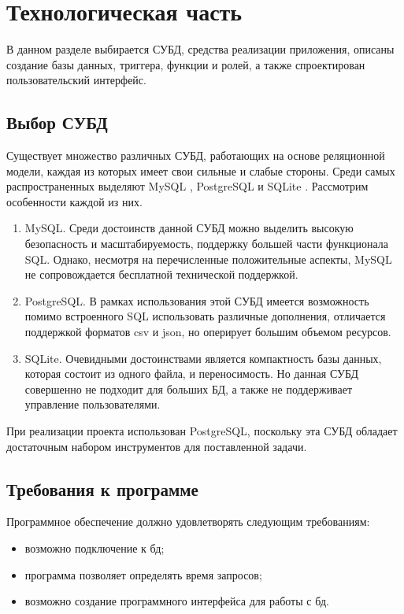 \section{Технологическая часть}

В данном разделе выбирается СУБД, средства реализации приложения,
описаны создание базы данных, триггера, функции и ролей,
а также спроектирован пользовательский интерфейс.

\subsection{Выбор СУБД}

Существует множество различных СУБД, работающих на основе реляционной модели,
каждая из которых имеет свои сильные и слабые стороны.
Среди самых распространенных \cite{most_popular} выделяют MySQL \cite{mysql},
PostgreSQL \cite{postgresql} и SQLite \cite{sqlite}.
Рассмотрим особенности каждой из них.

\begin{enumerate}
    \item MySQL. Среди достоинств данной СУБД можно выделить высокую
          безопасность и масштабируемость,
          поддержку большей части функционала SQL. Однако, несмотря на перечисленные
          положительные аспекты,
          MySQL не сопровождается бесплатной технической поддержкой.
    \item PostgreSQL. В рамках использования этой СУБД имеется возможность
          помимо встроенного SQL использовать различные дополнения,
          отличается поддержкой форматов csv и json, но оперирует большим объемом
          ресурсов.
    \item SQLite. Очевидными достоинствами является компактность базы
          данных, которая состоит из одного файла,
          и переносимость.
          Но данная СУБД совершенно не подходит для больших БД, а также не
          поддерживает управление пользователями.
\end{enumerate}

При реализации проекта использован PostgreSQL,
поскольку эта СУБД обладает достаточным набором инструментов для поставленной
задачи.
\subsection{Требования к программе}

Программное обеспечение должно удовлетворять следующим требованиям:
\begin{itemize}
	\item возможно подключение к бд;
	\item программа позволяет определять время запросов;
	\item возможно создание программного интерфейса для работы с бд.
\end{itemize}

